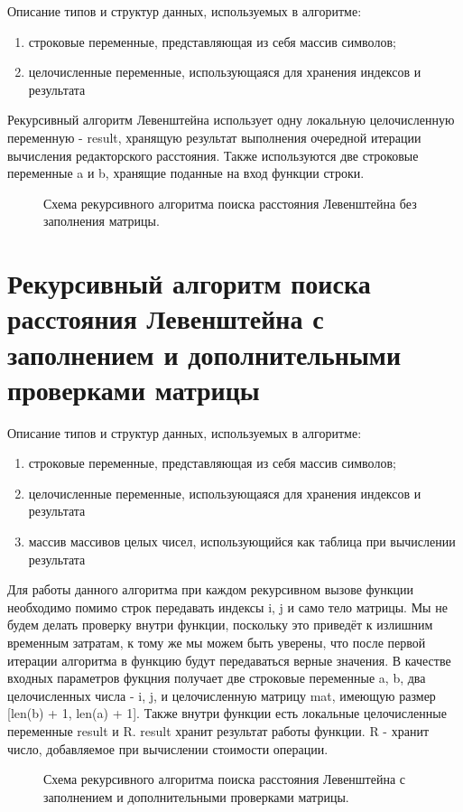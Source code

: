 Описание типов и структур данных, используемых в алгоритме:
\begin{enumerate}
	\item строковые переменные, представляющая из себя массив символов;
	\item целочисленные переменные, использующаяся для хранения индексов и результата
\end{enumerate}

Рекурсивный алгоритм Левенштейна использует одну локальную целочисленную переменную - result, хранящую результат выполнения очередной итерации вычисления редакторского расстояния. Также используются две строковые переменные a и b, хранящие поданные на вход функции строки.

\begin{figure}[ph!]
	\caption{Схема рекурсивного алгоритма поиска расстояния Левенштейна без заполнения матрицы.}
\end{figure}
\newpage

\section{Рекурсивный алгоритм поиска расстояния Левенштейна с заполнением и дополнительными проверками матрицы}

Описание типов и структур данных, используемых в алгоритме:
\begin{enumerate}
	\item строковые переменные, представляющая из себя массив символов;
	\item целочисленные переменные, использующаяся для хранения индексов и результата
	\item массив массивов целых чисел, использующийся как таблица при вычислении результата
\end{enumerate}

Для работы данного алгоритма при каждом рекурсивном вызове функции необходимо помимо строк передавать индексы i, j и само тело матрицы. Мы не будем делать проверку внутри функции, поскольку это приведёт к излишним временным затратам, к тому же мы можем быть уверены, что после первой итерации алгоритма в функцию будут передаваться верные значения. В качестве входных параметров фукцния получает две строковые переменные a, b, два целочисленных числа - i, j, и целочисленную матрицу mat, имеющую размер [len(b) + 1, len(a) + 1]. Также внутри функции есть локальные целочисленные переменные result и R. result хранит результат работы функции. R - хранит число, добавляемое при вычислении стоимости операции.
\newpage
\begin{figure}[ph!]
	\caption{Схема рекурсивного алгоритма поиска расстояния Левенштейна с заполнением и дополнительными проверками матрицы.}
\end{figure}
\newpage
